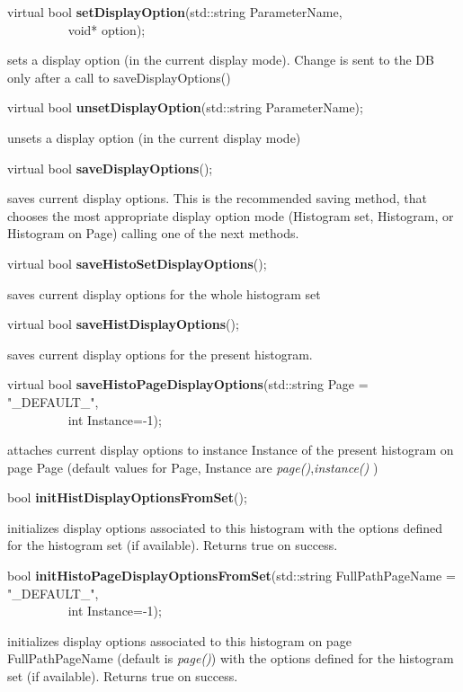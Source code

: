 \item    virtual bool {\bf setDisplayOption}(std::string ParameterName,\\\mbox{}~~~~~~~~~
			void* option);

 sets a display option (in the current display mode). Change is sent to the DB only 
 after a call to saveDisplayOptions()


\item    virtual bool {\bf unsetDisplayOption}(std::string ParameterName);


 unsets a display option (in the current display mode)


\item    virtual bool {\bf saveDisplayOptions}();


 saves current display options.  This is the recommended saving method, that
 chooses the most appropriate display option mode 
 (Histogram set, Histogram, or Histogram on Page) calling one of the next methods.


\item    virtual bool {\bf saveHistoSetDisplayOptions}();


 saves current display options for the whole histogram set


\item    virtual bool {\bf saveHistDisplayOptions}();


 saves current display options for the present histogram.


\item    virtual bool {\bf saveHistoPageDisplayOptions}(std::string Page = "\_DEFAULT\_",\\\mbox{}~~~~~~~~~
					   int Instance=-1);

 attaches current display options to instance Instance of the present histogram on page 
 Page (default values for Page, Instance are {\it page()},{\it instance()}  )


\item    bool {\bf initHistDisplayOptionsFromSet}(); 


 initializes display options associated to this histogram with the
 options defined for the histogram set (if available). Returns true on
 success.


\item    bool {\bf initHistoPageDisplayOptionsFromSet}(std::string FullPathPageName = "\_DEFAULT\_",\\\mbox{}~~~~~~~~~
					  int Instance=-1);

 initializes display options associated to this histogram on page
 FullPathPageName (default is {\it page()}) with the
 options defined for the histogram set (if available). Returns true on
 success.


